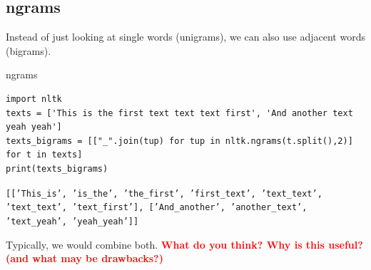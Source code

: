 \documentclass[compress]{beamer}
\begin{document}


\subsection{ngrams}
\begin{frame}
Instead of just looking at single words (unigrams), we can also use adjacent words (bigrams).
\end{frame}

\begin{frame}[fragile]{ngrams}
\begin{lstlisting}
import nltk
texts = ['This is the first text text text first', 'And another text yeah yeah']
texts_bigrams = [["_".join(tup) for tup in nltk.ngrams(t.split(),2)] for t in texts]
print(texts_bigrams)
\end{lstlisting}
\texttt{[['This\_is',
'is\_the',
'the\_first',
'first\_text',
'text\_text',
'text\_text',
'text\_first'],
['And\_another', 'another\_text', 'text\_yeah', 'yeah\_yeah']]
}

Typically, we would combine both.
\pause
\textbf{\textcolor{red}{What do you think? Why is this useful? (and what may be drawbacks?)}}
\end{frame}
\end{document}
